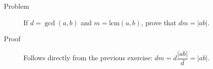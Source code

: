 \begin{description}
\item[Problem] If $d = \gcd(a, b)$ and $m = \text{lcm}(a, b)$, prove that $dm =
|ab|$.
\item[Proof] Follows directly from the previous exercise: $dm = d\dfrac{|ab|} d
= |ab|$.
\end{description}
